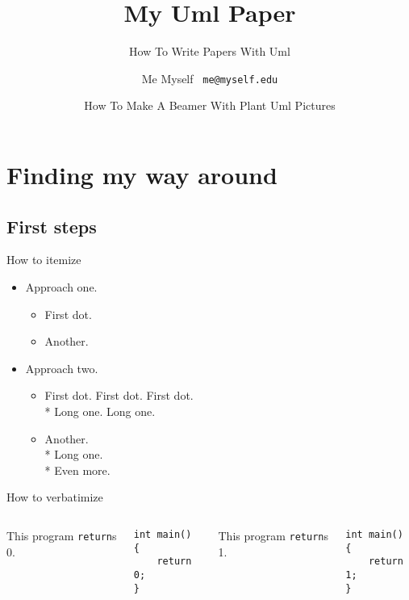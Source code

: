 \documentclass{beamer}
\title{My Uml Paper}
\subtitle{How To Write Papers With Uml}
\author[Me]{Me Myself \ \texttt{me@myself.edu}}
\date[UML2015]{How To Make A Beamer With Plant Uml Pictures}
\begin{document}
\begin{frame}
  \titlepage
\end{frame}

\begin{frame}
  \tableofcontents
\end{frame}

\section{Finding my way around}

\subsection{First steps}

\begin{frame}{How to itemize}
      \begin{itemize}
          \item Approach one.
          \begin{itemize}
            \item First dot.
            \item Another.
        \end{itemize}
          \item Approach two.
          \begin{itemize}
            \item First dot. First dot. First dot.
                  \\* Long one. Long one.
            \item Another.
                  \\* Long one.
                  \\* Even more.
        \end{itemize}
    \end{itemize}
\end{frame}

\begin{frame}[fragile]{How to verbatimize}
    \begin{columns}
            This program \texttt{return}s 0.
\begin{verbatim}
int main()
{
    return 0;
}
\end{verbatim}
            This program \texttt{return}s 1.
\begin{verbatim}
int main()
{
    return 1;
}
\end{verbatim}
    \end{columns}
\end{frame}
\end{document}
